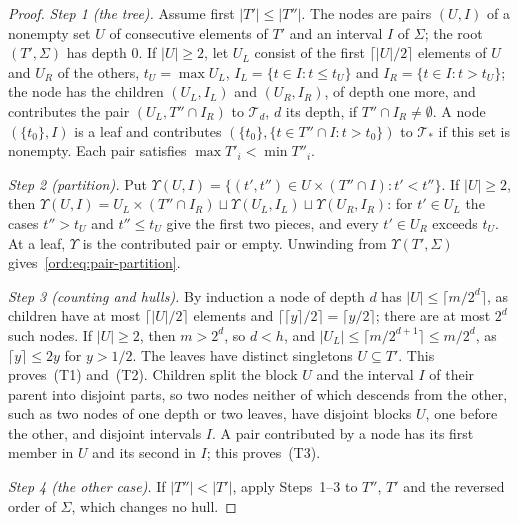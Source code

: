 \documentclass[11pt]{amsart}
\theoremstyle{definition}
\theoremstyle{remark}
\numberwithin{equation}{section}
\newcommand{\abs}[1]{\lvert #1\rvert}
\theoremstyle{plain}
\theoremstyle{definition}
\theoremstyle{plain}
\begin{document}
\begin{proof}
\emph{Step 1 (the tree).} Assume first $\abs{T'}\le\abs{T''}$. The nodes are pairs $(U,I)$ of a nonempty set $U$ of
consecutive elements of $T'$ and an interval $I$ of $\Sigma$; the root $(T',\Sigma)$ has depth $0$. If $\abs U\ge2$, let
$U_L$ consist of the first $\lceil\abs U/2\rceil$ elements of $U$ and $U_R$ of the others, $t_U=\max U_L$,
$I_L=\{t\in I:t\le t_U\}$ and $I_R=\{t\in I:t>t_U\}$; the node has the children $(U_L,I_L)$ and $(U_R,I_R)$, of depth
one more, and contributes the pair $(U_L,T''\cap I_R)$ to $\mathcal T_d$, $d$ its depth, if $T''\cap I_R\ne\emptyset$. A
node $(\{t_0\},I)$ is a leaf and contributes $(\{t_0\},\{t\in T''\cap I:t>t_0\})$ to $\mathcal T_\ast$ if this set is
nonempty. Each pair satisfies $\max T'_i<\min T''_i$.

\emph{Step 2 (partition).} Put $\Upsilon(U,I)=\{(t',t'')\in U\times(T''\cap I):t'<t''\}$. If $\abs U\ge2$, then
$\Upsilon(U,I)=U_L\times(T''\cap I_R)\sqcup\Upsilon(U_L,I_L)\sqcup\Upsilon(U_R,I_R)$: for $t'\in U_L$ the cases $t''>t_U$
and $t''\le t_U$ give the first two pieces, and every $t'\in U_R$ exceeds $t_U$. At a leaf, $\Upsilon$ is the contributed
pair or empty. Unwinding from $\Upsilon(T',\Sigma)$ gives~\eqref{ord:eq:pair-partition}.

\emph{Step 3 (counting and hulls).} By induction a node of depth $d$ has $\abs U\le\lceil m/2^d\rceil$, as children
have at most $\lceil\abs U/2\rceil$ elements and $\lceil\lceil y\rceil/2\rceil=\lceil y/2\rceil$; there are at most
$2^d$ such nodes. If $\abs U\ge2$, then $m>2^d$, so $d<h$, and $\abs{U_L}\le\lceil m/2^{d+1}\rceil\le m/2^d$, as
$\lceil y\rceil\le2y$ for $y>1/2$. The leaves have distinct singletons $U\subseteq T'$. This proves~(T1) and~(T2).
Children split the block $U$ and the interval $I$ of their parent into disjoint parts, so two nodes neither of which
descends from the other, such as two nodes of one depth or two leaves, have disjoint blocks $U$, one before the
other, and disjoint intervals $I$. A pair contributed by a node has its first member in $U$ and its second in $I$; this
proves~(T3).

\emph{Step 4 (the other case).} If $\abs{T''}<\abs{T'}$, apply Steps~1--3 to $T''$, $T'$ and the reversed order of
$\Sigma$, which changes no hull.
\end{proof}
\end{document}
